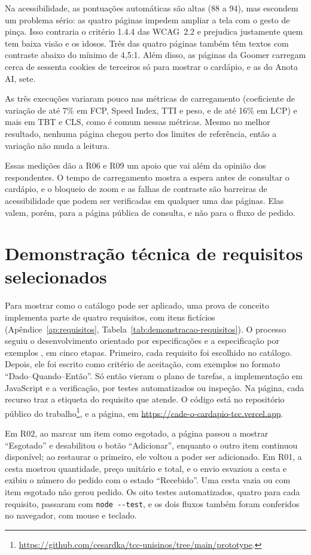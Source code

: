 Na acessibilidade, as pontuações automáticas são altas (88 a 94), mas escondem um problema sério: as quatro páginas impedem ampliar a tela com o gesto de pinça. Isso contraria o critério 1.4.4 das WCAG~2.2 \cite{wcag22} e prejudica justamente quem tem baixa visão e os idosos. Três das quatro páginas também têm textos com contraste abaixo do mínimo de 4,5:1. Além disso, as páginas da Goomer carregam cerca de sessenta cookies de terceiros só para mostrar o cardápio, e as do Anota AI, sete.

As três execuções variaram pouco nas métricas de carregamento (coeficiente de variação de até 7\% em FCP, Speed Index, TTI e peso, e de até 16\% em LCP) e mais em TBT e CLS, como é comum nessas métricas. Mesmo no melhor resultado, nenhuma página chegou perto dos limites de referência, então a variação não muda a leitura.

Essas medições dão a R06 e R09 um apoio que vai além da opinião dos respondentes. O tempo de carregamento mostra a espera antes de consultar o cardápio, e o bloqueio de zoom e as falhas de contraste são barreiras de acessibilidade que podem ser verificadas em qualquer uma das páginas. Elas valem, porém, para a página pública de consulta, e não para o fluxo de pedido.

\section{Demonstração técnica de requisitos selecionados}
\label{sec:res-demonstracao}

Para mostrar como o catálogo pode ser aplicado, uma prova de conceito implementa parte de quatro requisitos, com itens fictícios (Apêndice~\ref{ap:requisitos}, Tabela~\ref{tab:demonstracao-requisitos}). O processo seguiu o desenvolvimento orientado por especificações \cite{github2026speckit} e a especificação por exemplos \cite{adzic2011specification}, em cinco etapas. Primeiro, cada requisito foi escolhido no catálogo. Depois, ele foi escrito como critério de aceitação, com exemplos no formato ``Dado--Quando--Então''. Só então vieram o plano de tarefas, a implementação em JavaScript e a verificação, por testes automatizados ou inspeção. Na página, cada recurso traz a etiqueta do requisito que atende. O código está no repositório público do trabalho\footnote{\url{https://github.com/cesardka/tcc-unisinos/tree/main/prototype}.}, e a página, em \url{https://cade-o-cardapio-tcc.vercel.app}.

Em R02, ao marcar um item como esgotado, a página passou a mostrar ``Esgotado'' e desabilitou o botão ``Adicionar'', enquanto o outro item continuou disponível; ao restaurar o primeiro, ele voltou a poder ser adicionado. Em R01, a cesta mostrou quantidade, preço unitário e total, e o envio esvaziou a cesta e exibiu o número do pedido com o estado ``Recebido''. Uma cesta vazia ou com item esgotado não gerou pedido. Os oito testes automatizados, quatro para cada requisito, passaram com \texttt{node -{}-test}, e os dois fluxos também foram conferidos no navegador, com mouse e teclado.

